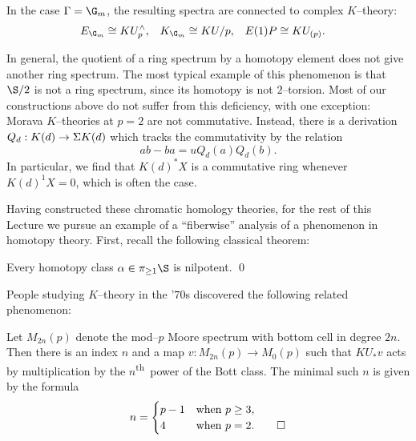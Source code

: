 \begin{example}\label{ExampleOfMoravasTheoriesAtGm}
In the case $\Gamma = \G_m$, the resulting spectra are connected to complex $K$--theory:
\begin{align*}
E_{\G_m} & \cong KU^\wedge_p, &
K_{\G_m} & \cong KU / p, &
E(1)P & \cong KU_{(p)}.
\end{align*}
\end{example}

\begin{remark}\label{MoravaKIsNotCommutative}
In general, the quotient of a ring spectrum by a homotopy element does not give another ring spectrum.  The most typical example of this phenomenon is that $\S/2$ is not a ring spectrum, since its homotopy is not $2$--torsion.  Most of our constructions above do not suffer from this deficiency, with one exception: Morava $K$--theories at $p = 2$ are not commutative.  Instead, there is a derivation $Q_d: K(d) \to \Sigma K(d)$ which tracks the commutativity by the relation \[ab - ba = u Q_d(a) Q_d(b).\]  In particular, we find that $K(d)^* X$ is a commutative ring whenever $K(d)^1 X = 0$, which is often the case.
\end{remark}

Having constructed these chromatic homology theories, for the rest of this Lecture we pursue an example of a ``fiberwise'' analysis of a phenomenon in homotopy theory.  First, recall the following classical theorem:

\begin{theorem}
Every homotopy class $\alpha \in \pi_{\ge 1} \S$ is nilpotent. \qed
\end{theorem}

\noindent People studying $K$--theory in the '$70$s discovered the following related phenomenon:

\begin{theorem}\label{AdamsSelfMapThm}
Let $M_{2n}(p)$ denote the mod--$p$ Moore spectrum with bottom cell in degree $2n$.  Then there is an index $n$ and a map $v: M_{2n}(p) \to M_0(p)$ such that $KU_* v$ acts by multiplication by the $n$\textsuperscript{th}\, power of the Bott class.  The minimal such $n$ is given by the formula \[n = \begin{cases} p-1 & \text{when $p \ge 3$}, \\ 4 & \text{when $p = 2$}. \qed \end{cases}\]
\end{theorem}

